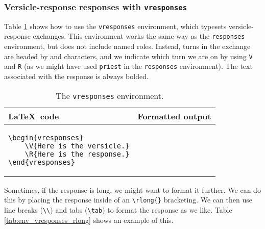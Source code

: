 \documentclass{article}
\begin{document}
\subsubsection{Versicle-response responses with \lstinline{vresponses}}

Table \ref{tab:env_vresponses} shows how to use the \lstinline{vresponses} environment, which typesets versicle-response exchanges. This environment works the same way as the \lstinline{responses} environment, but does not include named roles. Instead, turns in the exchange are headed by \versicle and \response characters, and we indicate which turn we are on by using \lstinline{V} and \lstinline{R} (as we might have used \lstinline{priest} in the \lstinline{responses} environment). The text associated with the response is always bolded.

\begin{table}[h]
\centering
\begin{tabular}{ll}
\toprule
\LaTeX\ code & Formatted output \\
\midrule
\begin{lstlisting}
\begin{vresponses}
	\V{Here is the versicle.}
	\R{Here is the response.}
\end{vresponses}
\end{lstlisting}
&
\sabon{
\begin{vresponsesex}
	\V{Here is the versicle.}
	\R{Here is the response.}
\end{vresponsesex}
}
\\
\bottomrule
\end{tabular}
\caption{The \lstinline{vresponses} environment.}
\label{tab:env_vresponses}
\end{table}

Sometimes, if the response is long, we might want to format it further. We can do this by placing the response inside of an \lstinline|\rlong{}| bracketing. We can then use line breaks (\lstinline{\\}) and tabs (\lstinline{\tab}) to format the response as we like. Table \ref{tab:env_vresponses_rlong} shows an example of this.
\end{document}
